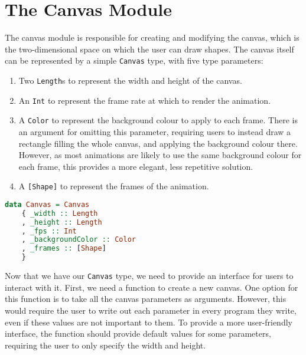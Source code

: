 \documentclass[../main.tex]{subfiles}
\begin{document}
    \section{The Canvas Module}
        The canvas module is responsible for creating and modifying the canvas, which
            is the two-dimensional space on which the user can draw shapes.
        The canvas itself can be represented by a simple \verb|Canvas| type, with five type parameters:
        \begin{enumerate}
            \item Two \verb|Length|s to represent the width and height of the canvas.
            \item An \verb|Int| to represent the frame rate at which to render the animation.
            \item A \verb|Color| to represent the background colour to apply to each frame.
                  There is an argument for omitting this parameter, requiring users to instead
                      draw a rectangle filling the whole canvas, and applying the background colour
                      there.
                  However, as most animations are likely to use the same background colour for
                      each frame, this provides a more elegant, less repetitive solution.
            \item A \verb|[Shape]| to represent the frames of the animation.
        \end{enumerate}

        \begin{lstlisting}[language=Haskell, label={lst:canvas}, caption={The Canvas type definition.
            We use the field labels for internal use only. These are not exposed to the user, and are
            prefixed with \_ to indicate such, as well as to avoid polluting the namespace.}]
data Canvas = Canvas
    { _width :: Length
    , _height :: Length
    , _fps :: Int
    , _backgroundColor :: Color
    , _frames :: [Shape]
    }
        \end{lstlisting}

        Now that we have our \verb|Canvas| type, we need to provide an interface for
            users to interact with it.
        First, we need a function to create a new canvas.
        One option for this function is to take all the canvas parameters as arguments.
        However, this would require the user to write out each parameter in every
            program they write, even if these values are not important to them.
        To provide a more user-friendly interface, the function should provide default
            values for some parameters, requiring the user to only specify the width and
            height.
\end{document}
